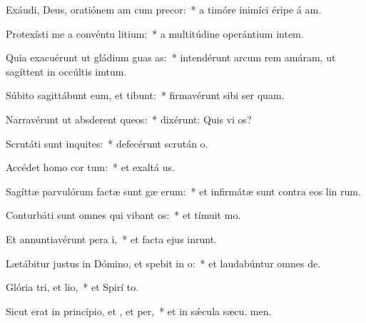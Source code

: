 \item Exáudi, Deus, oratiónem am cum precor:~* a timóre inimíci éripe á am.
\item Protexísti me a convéntu litium:~* a multitúdine operántium intem.
\item Quia exacuérunt ut gládium guas as:~* intendérunt arcum rem amáram, ut sagíttent in occúltis imtum.
\item Súbito sagittábunt eum, et  tibunt:~* firmavérunt sibi ser quam.
\item Narravérunt ut absderent queos:~* dixérunt: Quis vi os?
\item Scrutáti sunt inquites:~* defecérunt scrután o.
\item Accédet homo  cor tum:~* et exaltá us.
\item Sagíttæ parvulórum factæ sunt gæ erum:~* et infirmátæ sunt contra eos lin rum.
\item Conturbáti sunt omnes qui vibant os:~* et tímuit  mo.
\item Et annuntiavérunt pera i,~* et facta ejus inrunt.
\item Lætábitur justus in Dómino, et spebit in o:~* et laudabúntur omnes  de.
\item Glória tri, et lio,~* et Spirí to.
\item Sicut erat in princípio, et , et per,~* et in sǽcula sæcu. men.
